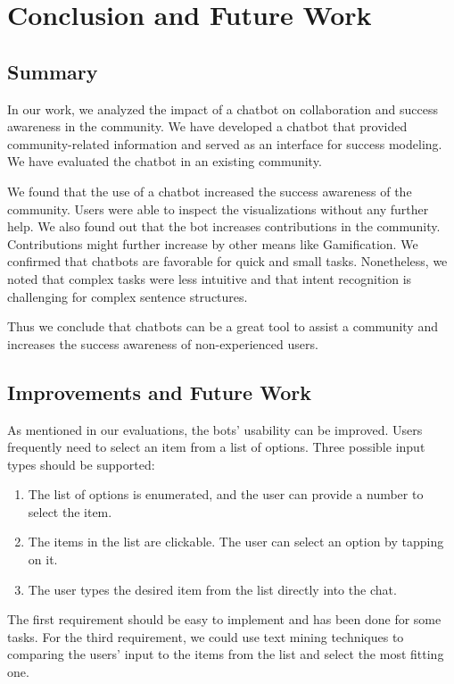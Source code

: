 \chapter{Conclusion and Future Work}

\section{Summary}
In our work, we analyzed the impact of a chatbot on collaboration and success awareness in the community. We have developed a chatbot that provided community-related information and served as an interface for success modeling.  We have evaluated the chatbot in an existing community.

We found that the use of a chatbot increased the success awareness of the community. Users were able to inspect the visualizations without any further help.
We also found out that the bot increases contributions in the community. Contributions might further increase by other means like Gamification. 
We confirmed that chatbots are favorable for quick and small tasks. Nonetheless, we noted that complex tasks were less intuitive and that intent recognition is challenging for complex sentence structures.

Thus we conclude that chatbots can be a great tool to assist a community and increases the success awareness of non-experienced users.  


\section{Improvements and Future Work}
As mentioned in our evaluations, the bots' usability can be improved.
Users frequently need to select an item from a list of options. Three possible input types should be supported:
\begin{enumerate}
    \item The list of options is enumerated, and the user can provide a number to select the item.
    \item The items in the list are clickable. The user can select an option by tapping on it. 
    \item The user types the desired item from the list directly into the chat. 
\end{enumerate}
The first requirement should be easy to implement and has been done for some tasks.
For the third requirement, we could use text mining techniques to comparing the users' input to the items from the list and select the most fitting one.

